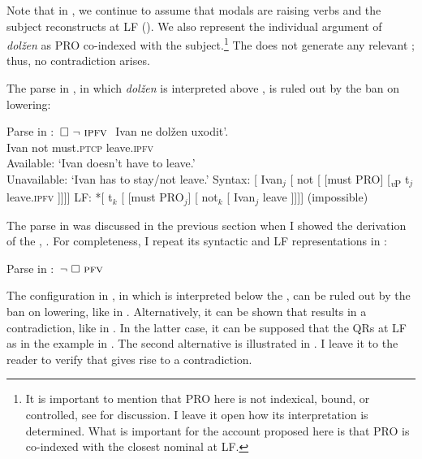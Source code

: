 \documentclass[output=paper,newtxmath,colorlinks,citecolor=brown]{langsci/langscibook}
\begin{document}
\noindent Note that in , we continue to assume that modals are raising verbs and the subject reconstructs at LF (\citealt{iatzei13}). We also represent the individual argument of \textit{dolžen} as PRO co-indexed with the subject.\footnote{It is important to mention that PRO here is not indexical, bound, or controlled, see  \citet[500]{ste07} for discussion. I leave it open how its interpretation is determined. What is important for the account proposed here is that PRO is co-indexed with the closest nominal at LF.
}
The  does not generate any relevant ; thus, no contradiction arises.

The parse in , in which \textit{dolžen} is interpreted above , is ruled out by the ban on  lowering:

\ea Parse in :  $\,\Box\ \neg\ \textsc{ipfv\ }$ \label{detailsp1b}
	\ea \gll Ivan ne dolžen uxodit'. \\
  	Ivan not must.\textsc{ptcp}  leave.\textsc{ipfv}\\
  	\glt Available: `Ivan doesn't have to leave.'\\
 	Unavailable: `Ivan has to stay/not leave.'
	\ex Syntax: [ Ivan$_j$ [ not [ [must PRO]  [\textsubscript{\textit{v}P} t$_j$ leave.\textsc{ipfv} ]]]]
    \ex LF: *[ t$_k$ [ [must PRO$_j$] [ not$_k$  [ Ivan$_j$ leave  ]]]] \hfill (impossible)
            \z \z

\noindent The parse in  was discussed in the previous section when I showed the derivation of the , . For completeness, I repeat its syntactic and LF representations in :

\newpage
\ea  Parse in :  $\,\neg \ \Box\ \textsc{pfv\ }$ \label{dtailsp1c}
	\z \z

\noindent The configuration in , in which  is interpreted below the , can be ruled out by the ban on  lowering, like in  .  Alternatively, it can be shown that  results in a contradiction, like in . In the latter case, it can be supposed that the  QRs at LF as in the  example in . The second alternative is illustrated in . I leave it to the reader to verify that  gives rise to a contradiction.
\end{document}
